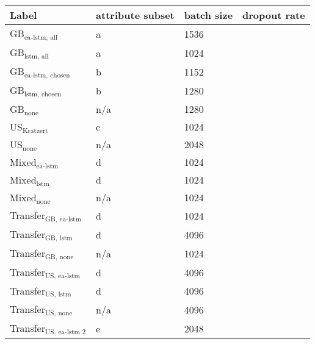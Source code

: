 \begin{tabular}{llll}
    \toprule
    Label & attribute subset & batch size & dropout rate\\
    \midrule
    GB$_\text{ea-lstm, all}$ & a &  1536 \\
    GB$_\text{lstm, all}$ & a & 1024 \\
    GB$_\text{ea-lstm, chosen}$ & b & 1152 \\
    GB$_\text{lstm, chosen}$ & b & 1280 \\
    GB$_\text{none}$ & n/a & 1280 \\
    US$_\text{Kratzert}$  & c & 1024 \\
    US$_\text{none}$  & n/a & 2048 \\
    Mixed$_\text{ea-lstm}$ & d & 1024 \\
    Mixed$_\text{lstm}$ & d & 1024 \\
    Mixed$_\text{none}$ & n/a & 1024 \\
    Transfer$_\text{GB, ea-lstm}$ & d  & 1024 \\
    Transfer$_\text{GB, lstm}$ & d  & 4096 \\
    Transfer$_\text{GB, none}$ & n/a & 1024 \\
    Transfer$_\text{US, ea-lstm}$ & d & 4096 \\
    Transfer$_\text{US, lstm}$  & d & 4096 \\ 
    Transfer$_\text{US, none}$  & n/a & 4096 \\
    Transfer$_\text{US, ea-lstm 2}$ & e & 2048 \\

\end{tabular}
